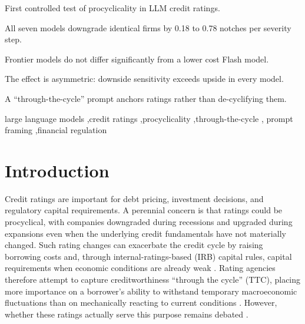 \documentclass[a4paper,fleqn]{cas-sc}
\begin{document}
\begin{highlights}
\item First controlled test of procyclicality in LLM credit ratings.
\item All seven models downgrade identical firms by 0.18 to 0.78 notches per severity step.
\item Frontier models do not differ significantly from a lower cost Flash model.
\item The effect is asymmetric: downside sensitivity exceeds upside in every model.
\item A ``through-the-cycle'' prompt anchors ratings rather than de-cyclifying them.
\end{highlights}

\begin{keywords}
large language models \sep credit ratings \sep procyclicality \sep through-the-cycle \sep
prompt framing \sep financial regulation
\end{keywords}

\maketitle

\section{Introduction}\label{sec:intro}
Credit ratings are important for debt pricing, investment decisions, and regulatory capital
requirements. A perennial concern is that ratings could be procyclical, with companies downgraded
during recessions and upgraded during expansions even when the underlying credit fundamentals have not
materially changed. Such rating changes can exacerbate the credit cycle by raising borrowing costs and,
through internal-ratings-based (IRB) capital rules, capital requirements when economic conditions are
already weak \citep{kashyap2004,gordy2006}. Rating agencies therefore attempt to capture
creditworthiness ``through the cycle'' (TTC), placing more importance on a borrower's ability to
withstand temporary macroeconomic fluctuations than on mechanically reacting to current conditions
\citep{amato2004,loffler2004}. However, whether these ratings actually serve this purpose remains
debated \citep{loffler2013}.
\end{document}
